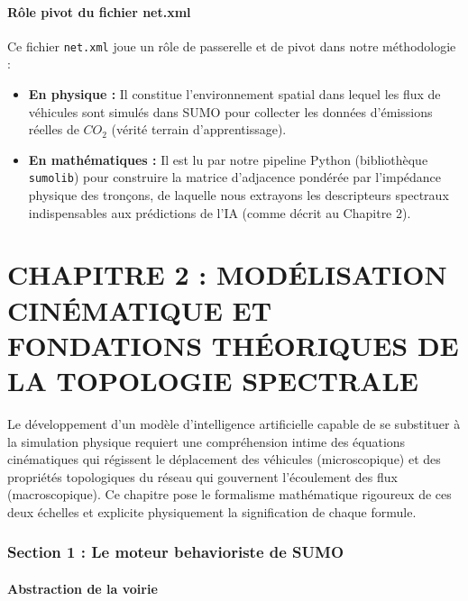 \documentclass[10pt, a4paper]{article}
\providecommand{\tightlist}{}
\begin{document}
\paragraph{Rôle pivot du fichier
net.xml}\label{ruxf4le-pivot-du-fichier-net.xml}

Ce fichier \texttt{net.xml} joue un rôle de passerelle et de pivot dans
notre méthodologie :

\begin{itemize}
\tightlist
\item
  \textbf{En physique :} Il constitue l'environnement spatial dans
  lequel les flux de véhicules sont simulés dans SUMO pour collecter les
  données d'émissions réelles de \(CO_2\) (vérité terrain
  d'apprentissage).
\item
  \textbf{En mathématiques :} Il est lu par notre pipeline Python
  (bibliothèque \texttt{sumolib}) pour construire la matrice d'adjacence
  pondérée par l'impédance physique des tronçons, de laquelle nous
  extrayons les descripteurs spectraux indispensables aux prédictions de
  l'IA (comme décrit au Chapitre 2).
\end{itemize}

\newpage

\section{CHAPITRE 2 : MODÉLISATION CINÉMATIQUE ET FONDATIONS THÉORIQUES
DE LA TOPOLOGIE
SPECTRALE}\label{chapitre-2-moduxe9lisation-cinuxe9matique-et-fondations-thuxe9oriques-de-la-topologie-spectrale}

Le développement d'un modèle d'intelligence artificielle capable de se
substituer à la simulation physique requiert une compréhension intime
des équations cinématiques qui régissent le déplacement des véhicules
(microscopique) et des propriétés topologiques du réseau qui gouvernent
l'écoulement des flux (macroscopique). Ce chapitre pose le formalisme
mathématique rigoureux de ces deux échelles et explicite physiquement la
signification de chaque formule.

\subsubsection{Section 1 : Le moteur behavioriste de
SUMO}\label{section-1-le-moteur-behavioriste-de-sumo}

\paragraph{Abstraction de la voirie}\label{abstraction-de-la-voirie}
\end{document}
